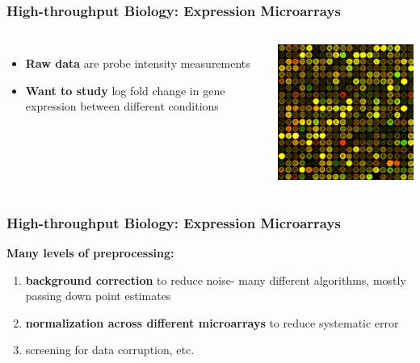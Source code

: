 \documentclass[10pt, compress]{beamer}
\begin{document}
\begin{frame}[fragile]
    \frametitle{High-throughput Biology: Expression Microarrays}
    
    \begin{columns}
            \begin{itemize}
                \item \textbf{Raw data} are probe intensity measurements
                \item \textbf{Want to study} log fold change in gene expression between different conditions
            \end{itemize}
        \vspace{.01cm}
            \includegraphics[height=\textheight]{assets/microarray.jpg}
    \end{columns}
    
\end{frame}

\begin{frame}[fragile]
    \frametitle{High-throughput Biology: Expression Microarrays}
    
    \textbf{Many levels of preprocessing:} 

    \begin{enumerate}
    \item \textbf{background correction} to reduce noise- many different algorithms, mostly passing down point estimates
    \vspace*{5mm}
    \item \textbf{normalization across different microarrays} to reduce systematic error
    \vspace*{5mm}
    \item screening for data corruption, etc.
    \end{enumerate}
    
\end{frame}
\end{document}
